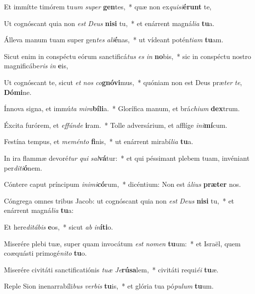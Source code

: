 \item Et immítte timórem tu\textit{um} \textit{su}\textit{per} \textbf{gen}tes,~* quæ non ex\textit{qui}\textit{si}\textbf{é}\textbf{runt} te,
\item Ut cognóscant quia non \textit{est} \textit{De}\textit{us} \textbf{ni}\textbf{si} tu,~* et enárrent magná\textit{li}\textit{a} \textbf{tu}a.
\item Álleva manum tuam super gen\textit{tes} \textit{a}\textit{li}\textbf{é}nas,~* ut vídeant potén\textit{ti}\textit{am} \textbf{tu}am.
\item Sicut enim in conspéctu eórum sanctificá\textit{tus} \textit{es} \textit{in} \textbf{no}bis,~* sic in conspéctu nostro magnificábe\textit{ris} \textit{in} \textbf{e}is,
\item Ut cognóscant te, sicut \textit{et} \textit{nos} \textit{co}\textbf{gnó}\textbf{vi}mus,~* quóniam non est Deus præ\textit{ter} \textit{te}, \textbf{Dó}\textbf{mi}ne.
\item Ínnova signa, et immú\textit{ta} \textit{mi}\textit{ra}\textbf{bí}\textbf{li}a.~* Glorífica manum, et brá\textit{chi}\textit{um} \textbf{dex}trum.
\item Éxcita furórem, et \textit{ef}\textit{fún}\textit{de} \textbf{i}ram.~* Tolle adversárium, et afflíge \textit{in}\textit{i}\textbf{mí}cum.
\item Festína tempus, et \textit{me}\textit{mén}\textit{to} \textbf{fi}nis,~* ut enárrent mirabí\textit{li}\textit{a} \textbf{tu}a.
\item In ira flammæ devoré\textit{tur} \textit{qui} \textit{sal}\textbf{vá}tur:~* et qui péssimant plebem tuam, invéniant per\textit{di}\textit{ti}\textbf{ó}nem.
\item Cóntere caput príncipum \textit{in}\textit{i}\textit{mi}\textbf{có}rum,~* dicéntium: Non est á\textit{li}\textit{us} \textbf{præ}\textbf{ter} nos.
\item Cóngrega omnes tribus Jacob: ut cognóscant quia non \textit{est} \textit{De}\textit{us} \textbf{ni}\textbf{si} tu,~* et enárrent magná\textit{li}\textit{a} \textbf{tu}a:
\item Et here\textit{di}\textit{tá}\textit{bis} \textbf{e}os,~* sicut \textit{ab} \textit{in}\textbf{í}\textbf{ti}o.
\item Miserére plebi tuæ, super quam invocátum \textit{est} \textit{no}\textit{men} \textbf{tu}um:~* et Israël, quem coæquásti primogé\textit{ni}\textit{to} \textbf{tu}o.
\item Miserére civitáti sanctificatiónis \textit{tu}\textit{æ} \textit{Je}\textbf{rú}\textbf{sa}lem,~* civitáti requi\textit{é}\textit{i} \textbf{tu}æ.
\item Reple Sion inenarrabíli\textit{bus} \textit{ver}\textit{bis} \textbf{tu}is,~* et glória tua pó\textit{pu}\textit{lum} \textbf{tu}um.
